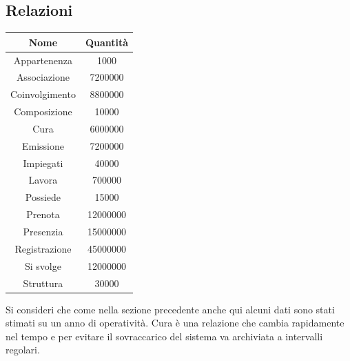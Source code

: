\documentclass[a4paper,12pt]{report}
\begin{document}
\subsection{Relazioni}
\begin{center}
  \begin{tabular}{ c | S[table-format=8.0, table-space-text-pre=(, table-space-text-post=)] }
    Nome & Quantità \\
    \hline
    Appartenenza & 1000 \\
    Associazione & 7200000 \\
    Coinvolgimento & 8800000 \\
    Composizione & 10000 \\
    Cura & 6000000 \\
    Emissione & 7200000 \\
    Impiegati & 40000 \\
    Lavora & 700000 \\
    Possiede & 15000 \\
    Prenota & 12000000 \\
    Presenzia & 15000000 \\
    Registrazione & 45000000 \\
    Si svolge & 12000000 \\
    Struttura & 30000 \\
  \end{tabular}
\end{center}

Si consideri che come nella sezione precedente anche qui alcuni dati sono stati stimati su un anno di operatività. 
Cura è una relazione che cambia rapidamente nel tempo e per evitare il sovraccarico del sistema va archiviata a intervalli regolari.
\end{document}
